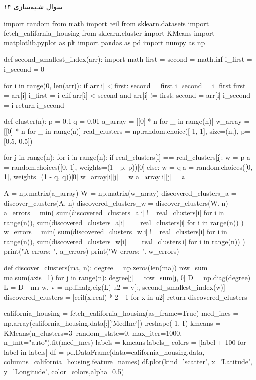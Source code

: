 سوال شبیه‌سازی ۱۴

\begin{latin}
\begin{python}
import random
from math import ceil
from sklearn.datasets import fetch_california_housing
from sklearn.cluster import KMeans
import matplotlib.pyplot as plt
import pandas as pd
import numpy as np


def second_smallest_index(arr):
    import math
    first = second = math.inf
    i_first = i_second = 0

    for i in range(0, len(arr)):
        if arr[i] < first:
            second = first
            i_second = i_first
            first = arr[i]
            i_first = i
        elif arr[i] < second and arr[i] != first:
            second = arr[i]
            i_second = i
    return i_second


def cluster(n):
    p = 0.1
    q = 0.01
    a_array = [[0] * n for _ in range(n)]
    w_array = [[0] * n for _ in range(n)]
    real_clusters = np.random.choice([-1, 1], size=(n,), p=[0.5, 0.5])

    for j in range(n):
        for i in range(n):
            if real_clusters[i] == real_clusters[j]:
                w = p
                a = random.choices([0, 1], weights=(1 - p, p))[0]
            else:
                w = q
                a = random.choices([0, 1], weights=(1 - q, q))[0]
            w_array[i][j] = w
            a_array[i][j] = a

    A = np.matrix(a_array)
    W = np.matrix(w_array)
    discovered_clusters_a = discover_clusters(A, n)
    discovered_clusters_w = discover_clusters(W, n)
    a_errors = min(
        sum(discovered_clusters_a[i] != real_clusters[i] 
        for i in range(n)),
        sum(discovered_clusters_a[i] == real_clusters[i] 
        for i in range(n))
    )
    w_errors = min(
        sum(discovered_clusters_w[i] != real_clusters[i] 
        for i in range(n)),
        sum(discovered_clusters_w[i] == real_clusters[i] 
        for i in range(n))
    )
    print("A errors: ", a_errors)
    print("W errors: ", w_errors)


def discover_clusters(ma, n):
    degree = np.zeros(len(ma))
    row_sum = ma.sum(axis=1)
    for j in range(n):
        degree[j] = row_sum[j, 0]
    D = np.diag(degree)
    L = D - ma
    w, v = np.linalg.eig(L)
    u2 = v[:, second_smallest_index(w)]
    discovered_clusters = [ceil(x.real) * 2 - 1 for x in u2]
    return discovered_clusters

california_housing = fetch_california_housing(as_frame=True)
med_incs = np.array(california_housing.data[:]['MedInc'])
.reshape(-1, 1)
kmeans = KMeans(n_clusters=3, random_state=0, max_iter=1000,
n_init="auto").fit(med_incs)
labels = kmeans.labels_
colors = [label + 100 for label in labels]
df = pd.DataFrame(data=california_housing.data,
columns=california_housing.feature_names)
df.plot(kind='scatter', x='Latitude', y='Longitude',
color=colors,alpha=0.5)
\end{python}
\end{latin}